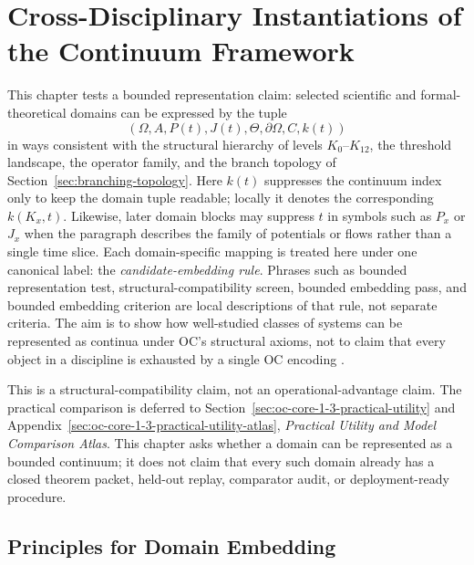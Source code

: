 
\section{Cross-Disciplinary Instantiations of the Continuum Framework}
\label{sec:disciplines-extended}

This chapter tests a bounded representation claim: selected scientific and
formal-theoretical domains can be expressed by the tuple
\[
  (\Omega, A, P(t), J(t), \Theta, \partial\Omega, C, k(t))
\]
in ways consistent with the structural hierarchy of levels
\(K_0\)–\(K_{12}\), the threshold landscape, the operator family, and the
branch topology of Section~\ref{sec:branching-topology}.  
Here \(k(t)\) suppresses the continuum index only to keep the domain tuple
readable; locally it denotes the corresponding \(k(K_x,t)\).
Likewise, later domain blocks may suppress \(t\) in symbols such as \(P_x\)
or \(J_x\) when the paragraph describes the family of potentials or flows
rather than a single time slice.
Each domain-specific mapping is treated here under one canonical label: the
\emph{candidate-embedding rule}. Phrases such as bounded representation test,
structural-compatibility screen, bounded embedding pass, and bounded embedding
criterion are local descriptions of that rule, not separate criteria. The aim
is to show how well-studied classes of systems can
be represented as continua under OC's structural axioms, not to claim that
every object in a discipline is exhausted by a single OC encoding
\parencite{anderson_more_is_different}.

This is a structural-compatibility claim, not an operational-advantage claim.
The practical comparison is deferred to
Section~\ref{sec:oc-core-1-3-practical-utility} and
Appendix~\ref{sec:oc-core-1-3-practical-utility-atlas}, \emph{Practical
Utility and Model Comparison Atlas}. This chapter asks
whether a domain can be represented as a bounded continuum; it does not claim
that every such domain already has a closed theorem packet, held-out replay,
comparator audit, or deployment-ready procedure.

\subsection{Principles for Domain Embedding}

